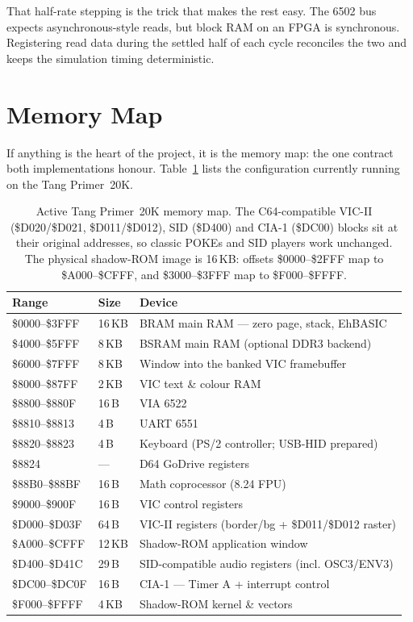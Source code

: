 \documentclass[11pt,a4paper]{article}
\newcommand{\reg}[1]{{\ttfamily #1}}
\begin{document}
That half-rate stepping is the trick that makes the rest easy. The 6502
bus expects asynchronous-style reads, but block RAM on an FPGA is
synchronous. Registering read data during the settled half of each cycle
reconciles the two and keeps the simulation timing deterministic.

\section{Memory Map}

If anything is the heart of the project, it is the memory map: the one
contract both implementations honour. Table~\ref{tab:map} lists the
configuration currently running on the Tang Primer~20K.

\begin{table}[h]
\centering
\small
\begin{tabular}{@{}>{\ttfamily}l l l@{}}
\toprule
\textnormal{\textbf{Range}} & \textbf{Size} & \textbf{Device} \\
\midrule
\$0000--\$3FFF & 16\,KB & BRAM main RAM --- zero page, stack, EhBASIC \\
\$4000--\$5FFF & 8\,KB  & BSRAM main RAM (optional DDR3 backend) \\
\$6000--\$7FFF & 8\,KB  & Window into the banked VIC framebuffer \\
\$8000--\$87FF & 2\,KB  & VIC text \& colour RAM \\
\$8800--\$880F & 16\,B  & VIA 6522 \\
\$8810--\$8813 & 4\,B   & UART 6551 \\
\$8820--\$8823 & 4\,B   & Keyboard (PS/2 controller; USB-HID prepared) \\
\$8824         & ---    & D64 GoDrive registers \\
\$88B0--\$88BF & 16\,B  & Math coprocessor (8.24 FPU) \\
\$9000--\$900F & 16\,B  & VIC control registers \\
\$D000--\$D03F & 64\,B  & VIC-II registers (border/bg + \$D011/\$D012 raster) \\
\$A000--\$CFFF & 12\,KB & Shadow-ROM application window \\
\$D400--\$D41C & 29\,B  & SID-compatible audio registers (incl. OSC3/ENV3) \\
\$DC00--\$DC0F & 16\,B  & CIA-1 --- Timer A + interrupt control \\
\$F000--\$FFFF & 4\,KB  & Shadow-ROM kernel \& vectors \\
\bottomrule
\end{tabular}
\caption{Active Tang Primer~20K memory map. The C64-compatible VIC-II
(\$D020/\$D021, \$D011/\$D012), SID (\$D400) and CIA-1 (\$DC00) blocks sit at
their original addresses, so classic \reg{POKE}s and SID players work
unchanged. The physical shadow-ROM image is 16\,KB: offsets
\reg{\$0000--\$2FFF} map to \reg{\$A000--\$CFFF}, and \reg{\$3000--\$3FFF}
map to \reg{\$F000--\$FFFF}.}
\label{tab:map}
\end{table}
\end{document}
